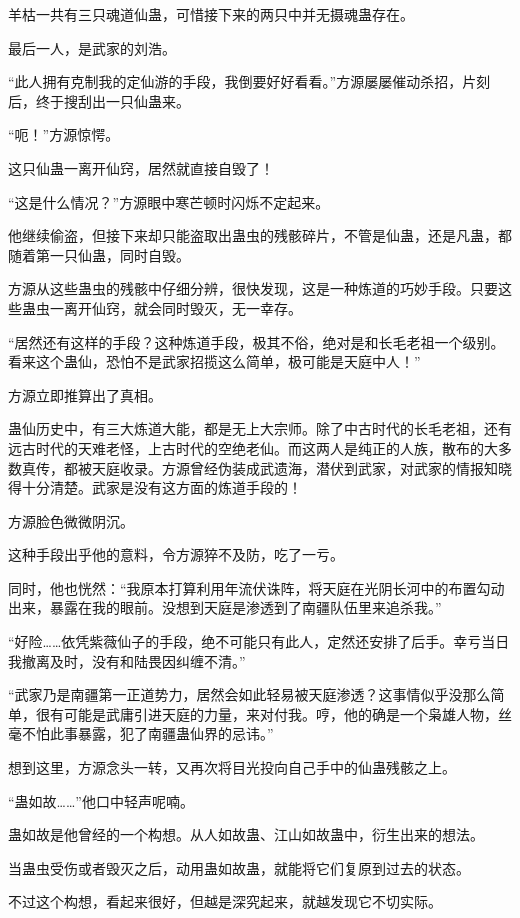 \begin{this_body}
羊枯一共有三只魂道仙蛊，可惜接下来的两只中并无摄魂蛊存在。

最后一人，是武家的刘浩。

“此人拥有克制我的定仙游的手段，我倒要好好看看。”方源屡屡催动杀招，片刻后，终于搜刮出一只仙蛊来。

“呃！”方源惊愕。

这只仙蛊一离开仙窍，居然就直接自毁了！

“这是什么情况？”方源眼中寒芒顿时闪烁不定起来。

他继续偷盗，但接下来却只能盗取出蛊虫的残骸碎片，不管是仙蛊，还是凡蛊，都随着第一只仙蛊，同时自毁。

方源从这些蛊虫的残骸中仔细分辨，很快发现，这是一种炼道的巧妙手段。只要这些蛊虫一离开仙窍，就会同时毁灭，无一幸存。

“居然还有这样的手段？这种炼道手段，极其不俗，绝对是和长毛老祖一个级别。看来这个蛊仙，恐怕不是武家招揽这么简单，极可能是天庭中人！”

方源立即推算出了真相。

蛊仙历史中，有三大炼道大能，都是无上大宗师。除了中古时代的长毛老祖，还有远古时代的天难老怪，上古时代的空绝老仙。而这两人是纯正的人族，散布的大多数真传，都被天庭收录。方源曾经伪装成武遗海，潜伏到武家，对武家的情报知晓得十分清楚。武家是没有这方面的炼道手段的！

方源脸色微微阴沉。

这种手段出乎他的意料，令方源猝不及防，吃了一亏。

同时，他也恍然：“我原本打算利用年流伏诛阵，将天庭在光阴长河中的布置勾动出来，暴露在我的眼前。没想到天庭是渗透到了南疆队伍里来追杀我。”

“好险……依凭紫薇仙子的手段，绝不可能只有此人，定然还安排了后手。幸亏当日我撤离及时，没有和陆畏因纠缠不清。”

“武家乃是南疆第一正道势力，居然会如此轻易被天庭渗透？这事情似乎没那么简单，很有可能是武庸引进天庭的力量，来对付我。哼，他的确是一个枭雄人物，丝毫不怕此事暴露，犯了南疆蛊仙界的忌讳。”

想到这里，方源念头一转，又再次将目光投向自己手中的仙蛊残骸之上。

“蛊如故……”他口中轻声呢喃。

蛊如故是他曾经的一个构想。从人如故蛊、江山如故蛊中，衍生出来的想法。

当蛊虫受伤或者毁灭之后，动用蛊如故蛊，就能将它们复原到过去的状态。

不过这个构想，看起来很好，但越是深究起来，就越发现它不切实际。


\end{this_body}
